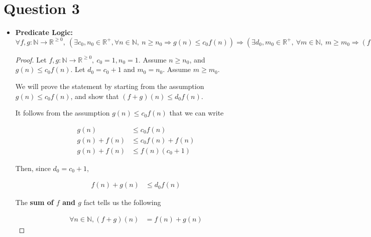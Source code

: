 \documentclass[12pt]{article}
\begin{document}
\section*{Question 3}
\begin{itemize}
    \item

    \textbf{Predicate Logic:} $\forall f,g:\mathbb{N} \to \mathbb{R}^{\geq 0},\:
    (\exists c_0,n_0 \in \mathbb{R}^{+}, \forall n \in \mathbb{N}, \:n \geq
    n_0 \Rightarrow g(n) \leq c_0f(n)) \Rightarrow (\exists d_0,m_0 \in
    \mathbb{R}^{+},\:\forall m \in \mathbb{N},\:m \geq m_0 \Rightarrow (f + g)(m)
    \leq d_0f(m))$

    \bigskip

    \begin{proof}
        Let $f,g: \mathbb{N} \to \mathbb{R}^{\geq 0},\:c_0 = 1, n_0 = 1$. Assume $n \geq n_0$,
        and $g(n) \leq c_0f(n)$. Let $d_0 = c_0 + 1$ and $m_0 = n_0$. Assume $m \geq m_0$.

        \bigskip

        We will prove the statement by starting from the assumption $g(n) \leq c_0f(n)$,
        and show that $(f + g)(n) \leq d_0f(n)$.

        \bigskip

        It follows from the assumption $g(n) \leq c_0f(n)$ that we can write

        \setcounter{equation}{0}
        \begin{align}
            g(n) &\leq c_0f(n)\\
            g(n) + f(n) &\leq c_0f(n) + f(n)\\
            g(n) + f(n) &\leq f(n)(c_0 + 1)
        \end{align}

        \bigskip

        Then, since $d_0 = c_0 + 1$,

        \begin{align}
            f(n) + g(n) &\leq d_0f(n)
        \end{align}

        \bigskip

        The \textbf{sum of $f$ and $g$} fact tells us the following

        \begin{align}
            \forall n \in \mathbb{N}, (f+g)(n) &= f(n) + g(n)
        \end{align}

        \bigskip


\end{proof}
\end{itemize}
\end{document}
